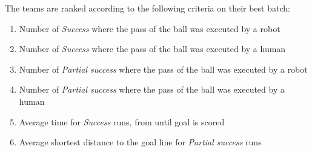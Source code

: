 The teams are ranked according to the following criteria on their best batch:
\begin{enumerate}
\item Number of \textit{Success} where the pass of the ball was executed by a robot
\item Number of \textit{Success} where the pass of the ball was executed by a human
\item Number of \textit{Partial success} where the pass of the ball was executed by a robot
\item Number of \textit{Partial success} where the pass of the ball was executed by a human
\item Average time for \textit{Success} runs, from   until goal is scored
\item Average shortest distance to the goal line for \textit{Partial success} runs
\end{enumerate}
